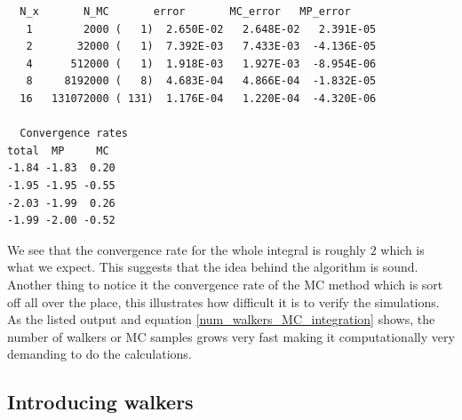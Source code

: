 \begin{lstlisting}
  N_x	    N_MC	   error       MC_error   MP_error
   1        2000 (   1)  2.650E-02   2.648E-02   2.391E-05
   2       32000 (   1)  7.392E-03   7.433E-03  -4.136E-05
   4      512000 (   1)  1.918E-03   1.927E-03  -8.954E-06
   8     8192000 (   8)  4.683E-04   4.866E-04  -1.832E-05
  16   131072000 ( 131)  1.176E-04   1.220E-04  -4.320E-06
  
  Convergence rates
total  MP     MC
-1.84 -1.83  0.20
-1.95 -1.95 -0.55
-2.03 -1.99  0.26
-1.99 -2.00 -0.52
\end{lstlisting}
We see that the convergence rate for the whole integral is roughly $2$ which is what we expect. This suggests that the idea behind the algorithm is sound. \\
Another thing to notice it the convergence rate of the MC method which is sort off all over the place, this illustrates how difficult it is to verify the simulations. 
As the listed output and equation \ref{num_walkers_MC_integration} shows, the number of walkers or MC samples grows very fast making it computationally very demanding to do the calculations.

\subsection{Introducing walkers}

